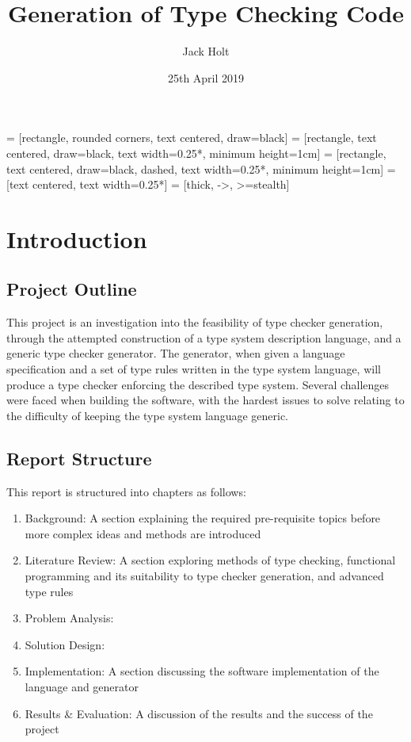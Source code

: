 \documentclass{UoYCSproject}
\title{Generation of Type Checking Code}
\author{Jack Holt}
\date{25th April 2019}
\begin{document}
 = [rectangle, rounded corners, text centered, draw=black]
 = [rectangle, text centered, draw=black,
text width=0.25*\columnwidth, minimum height=1cm]
 = [rectangle, text centered, draw=black, dashed,
text width=0.25*\columnwidth, minimum height=1cm]
 = [text centered, text width=0.25*\columnwidth]
 = [thick, ->, >=stealth]

\maketitle
\listoffigures
{}

\begin{summary}
\end{summary}

\chapter{Introduction}

\section{Project Outline}
This project is an investigation into the feasibility of type checker generation,
through the attempted construction of a type system description language, and a
generic type checker generator. The generator, when given a language specification 
and a set of type rules written in the type system language, will produce a 
type checker enforcing the described type system. Several challenges were faced 
when building the software, with the hardest issues to solve relating to the 
difficulty of keeping the type system language generic.


\section{Report Structure}
This report is structured into chapters as follows:
\begin{enumerate}
    \item Background: A section explaining the required pre-requisite topics
        before more complex ideas and methods are introduced
    \item Literature Review: A section exploring methods of type checking,
        functional programming and its suitability to type checker generation, 
        and advanced type rules
    \item Problem Analysis: 
    \item Solution Design:
    \item Implementation: A section discussing the software implementation of
        the language and generator
    \item Results \& Evaluation: A discussion of the results and the success
        of the project
\end{enumerate}
\end{document}
